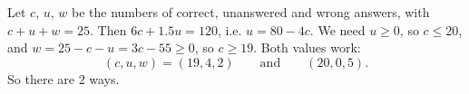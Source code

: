 Let $c$, $u$, $w$ be the numbers of correct, unanswered and wrong answers, with $c+u+w=25$. Then $6c+1.5u=120$, i.e. $u=80-4c$. We need $u\ge0$, so $c\le20$, and $w=25-c-u=3c-55\ge0$, so $c\ge19$. Both values work:
\[(c,u,w)=(19,4,2)\qquad\text{and}\qquad(20,0,5).\]
So there are $\boxed{2}$ ways.
